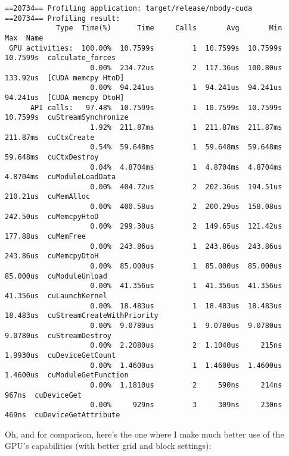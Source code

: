 {\scriptsize
\begin{verbatim}
==20734== Profiling application: target/release/nbody-cuda
==20734== Profiling result:
            Type  Time(%)      Time     Calls       Avg       Min       Max  Name
 GPU activities:  100.00%  10.7599s         1  10.7599s  10.7599s  10.7599s  calculate_forces
                    0.00%  234.72us         2  117.36us  100.80us  133.92us  [CUDA memcpy HtoD]
                    0.00%  94.241us         1  94.241us  94.241us  94.241us  [CUDA memcpy DtoH]
      API calls:   97.48%  10.7599s         1  10.7599s  10.7599s  10.7599s  cuStreamSynchronize
                    1.92%  211.87ms         1  211.87ms  211.87ms  211.87ms  cuCtxCreate
                    0.54%  59.648ms         1  59.648ms  59.648ms  59.648ms  cuCtxDestroy
                    0.04%  4.8704ms         1  4.8704ms  4.8704ms  4.8704ms  cuModuleLoadData
                    0.00%  404.72us         2  202.36us  194.51us  210.21us  cuMemAlloc
                    0.00%  400.58us         2  200.29us  158.08us  242.50us  cuMemcpyHtoD
                    0.00%  299.30us         2  149.65us  121.42us  177.88us  cuMemFree
                    0.00%  243.86us         1  243.86us  243.86us  243.86us  cuMemcpyDtoH
                    0.00%  85.000us         1  85.000us  85.000us  85.000us  cuModuleUnload
                    0.00%  41.356us         1  41.356us  41.356us  41.356us  cuLaunchKernel
                    0.00%  18.483us         1  18.483us  18.483us  18.483us  cuStreamCreateWithPriority
                    0.00%  9.0780us         1  9.0780us  9.0780us  9.0780us  cuStreamDestroy
                    0.00%  2.2080us         2  1.1040us     215ns  1.9930us  cuDeviceGetCount
                    0.00%  1.4600us         1  1.4600us  1.4600us  1.4600us  cuModuleGetFunction
                    0.00%  1.1810us         2     590ns     214ns     967ns  cuDeviceGet
                    0.00%     929ns         3     309ns     230ns     469ns  cuDeviceGetAttribute
\end{verbatim}
}

Oh, and for comparison, here's the one where I make much better use of the GPU's capabilities (with better grid and block settings):

